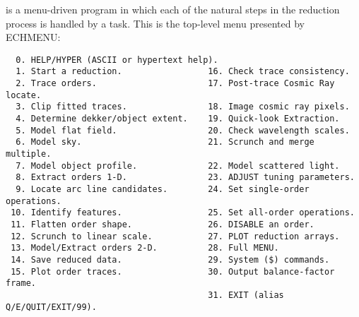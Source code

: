  is a menu-driven program in which each of
the natural steps in the reduction process is handled by a task.
This is the top-level menu presented by ECHMENU:

\begin{latexonly}
\begin{verbatim}
  0. HELP/HYPER (ASCII or hypertext help).
  1. Start a reduction.                 16. Check trace consistency.
  2. Trace orders.                      17. Post-trace Cosmic Ray locate.
  3. Clip fitted traces.                18. Image cosmic ray pixels.
  4. Determine dekker/object extent.    19. Quick-look Extraction.
  5. Model flat field.                  20. Check wavelength scales.
  6. Model sky.                         21. Scrunch and merge multiple.
  7. Model object profile.              22. Model scattered light.
  8. Extract orders 1-D.                23. ADJUST tuning parameters.
  9. Locate arc line candidates.        24. Set single-order operations.
 10. Identify features.                 25. Set all-order operations.
 11. Flatten order shape.               26. DISABLE an order.
 12. Scrunch to linear scale.           27. PLOT reduction arrays.
 13. Model/Extract orders 2-D.          28. Full MENU.
 14. Save reduced data.                 29. System ($) commands.
 15. Plot order traces.                 30. Output balance-factor frame.
                                        31. EXIT (alias Q/E/QUIT/EXIT/99).
\end{verbatim}
\end{latexonly}
